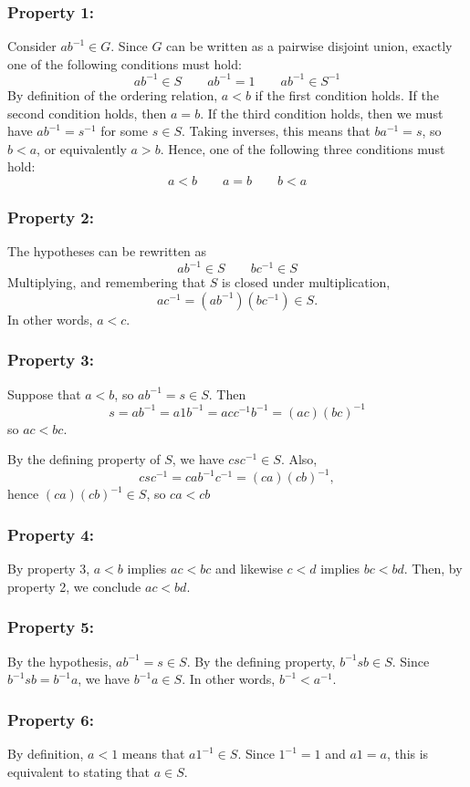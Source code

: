\documentclass[12pt]{article}
\begin{document}
\subsubsection*{Property 1:}

Consider $a b^{-1} \in G$.  Since $G$ can be written as a pairwise disjoint union, exactly one of the following conditions must hold:
 $$a b^{-1} \in S \qquad a b^{-1} = 1 \qquad a b^{-1} \in S^{-1}$$
By definition of the ordering relation, $a < b$ if the first condition holds.  If the second condition holds, then $a = b$.  If the third condition holds, then we must have $a b^{-1} = s^{-1}$ for some $s \in S$.  Taking inverses, this means that $b a^{-1} = s$, so $b < a$, or equivalently $a > b$.  Hence, one of the following three conditions must hold:
 $$a < b \qquad a = b \qquad b < a$$

\subsubsection*{Property 2:}

The hypotheses can be rewritten as
 $$a b^{-1} \in S \qquad b c^{-1} \in S$$
Multiplying, and remembering that $S$ is closed under multiplication,
 $$a c^{-1} = ( a b^{-1} )( b c^{-1} ) \in S.$$
In other words, $a < c$.

\subsubsection*{Property 3:}

Suppose that $a < b$, so $a b ^{-1} = s \in S$.   Then
 $$s = a b^{-1} = a 1 b^{-1} = a c c^{-1} b^{-1} = (ac) (bc)^{-1}$$
so $ac < bc$.

By the defining property of $S$, we have $c s c^{-1} \in S$.  Also,
 $$c s c^{-1} = c a b^{-1} c^{-1} = (ca) (cb)^{-1},$$
hence $(ca) (cb)^{-1} \in S$, so $ca < cb$

\subsubsection*{Property 4:}

By property 3, $a < b$ implies $ac < bc$ and likewise $c < d$ implies $bc < bd$.  Then, by property 2, we conclude $ac < bd$.

\subsubsection*{Property 5:}

By the hypothesis, $a b^{-1} = s \in S$.  By the defining property, $b^{-1} s b \in S$.  Since $b^{-1} s b = b^{-1} a$, we have $b^{-1} a \in S$.  In other words, $b^{-1} < a^{-1}$.

\subsubsection*{Property 6:}

By definition, $a < 1$ means that $a 1^{-1} \in S$.  Since $1^{-1} = 1$ and $a 1 = a$, this is equivalent to stating that $a \in S$.
\end{document}
